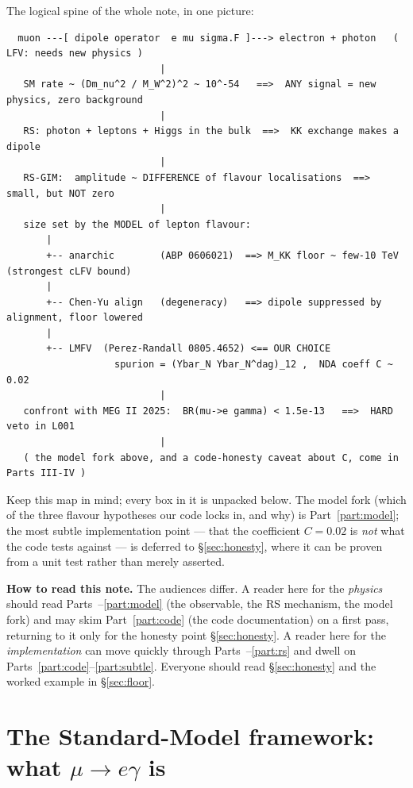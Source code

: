 \documentclass[11pt]{article}
\theoremstyle{definition}
\begin{document}
\noindent The logical spine of the whole note, in one picture:
\begin{footnotesize}
\begin{verbatim}
  muon ---[ dipole operator  e mu sigma.F ]---> electron + photon   ( LFV: needs new physics )
                           |
   SM rate ~ (Dm_nu^2 / M_W^2)^2 ~ 10^-54   ==>  ANY signal = new physics, zero background
                           |
   RS: photon + leptons + Higgs in the bulk  ==>  KK exchange makes a dipole
                           |
   RS-GIM:  amplitude ~ DIFFERENCE of flavour localisations  ==>  small, but NOT zero
                           |
   size set by the MODEL of lepton flavour:
       |
       +-- anarchic        (ABP 0606021)  ==> M_KK floor ~ few-10 TeV  (strongest cLFV bound)
       |
       +-- Chen-Yu align   (degeneracy)   ==> dipole suppressed by alignment, floor lowered
       |
       +-- LMFV  (Perez-Randall 0805.4652) <== OUR CHOICE
                   spurion = (Ybar_N Ybar_N^dag)_12 ,  NDA coeff C ~ 0.02
                           |
   confront with MEG II 2025:  BR(mu->e gamma) < 1.5e-13   ==>  HARD veto in L001
                           |
   ( the model fork above, and a code-honesty caveat about C, come in Parts III-IV )
\end{verbatim}
\end{footnotesize}
\noindent Keep this map in mind; every box in it is unpacked below. The model
fork (which of the three flavour hypotheses our code locks in, and why) is
Part~\ref{part:model}; the most subtle implementation point --- that the coefficient
$C=0.02$ is \emph{not} what the code tests against --- is deferred to
\S\ref{sec:honesty}, where it can be proven from a unit test rather than merely
asserted.

\medskip
\noindent\textbf{How to read this note.} The audiences differ.
A reader here for the \emph{physics} should read Parts~\ref{part:sm}--\ref{part:model}
(the observable, the RS mechanism, the model fork) and may skim Part~\ref{part:code}
(the code documentation) on a first pass, returning to it only for the honesty
point \S\ref{sec:honesty}. A reader here for the \emph{implementation} can move
quickly through Parts~\ref{part:sm}--\ref{part:rs} and dwell on
Parts~\ref{part:code}--\ref{part:subtle}. Everyone should read \S\ref{sec:honesty}
and the worked example in \S\ref{sec:floor}.

\part{The Standard-Model framework: what $\mu\to e\gamma$ is}
\label{part:sm}
\end{document}
